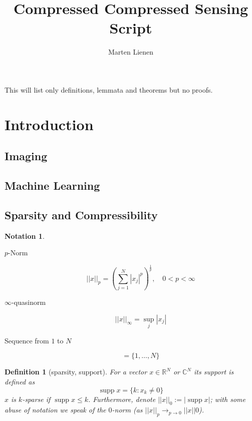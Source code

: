 \documentclass[10pt,a4paper]{article}
\title{Compressed Compressed Sensing Script}
\author{Marten Lienen}
\date{}
\theoremstyle{thmstyle}
\newtheorem{definition}{Definition}
\newtheorem{notation}{Notation}
\DeclareMathOperator{\supp}{supp}
\begin{document}
\maketitle

This will list only definitions, lemmata and theorems but no proofs.

\section{Introduction}

\subsection{Imaging}

\subsection{Machine Learning}

\subsection{Sparsity and Compressibility}

\begin{notation}
  \begin{description}
  \item[$p$-Norm]
    \begin{equation*}
      ||x||_{p} = \left( \sum_{j = 1}^{N} |x_{j}|^{p} \right)^{\frac{1}{p}}, \quad 0 < p < \infty
    \end{equation*}
  \item[$\infty$-quasinorm]
    \begin{equation*}
      ||x||_{\infty} = \sup_{j} |x_{j}|
    \end{equation*}
  \item[Sequence from $1$ to $N$]
    \begin{equation*}
      [N] = \{ 1, \dots, N \}
    \end{equation*}
  \end{description}
\end{notation}

\begin{definition}[sparsity, support]
  For a vector $x \in \mathbb{R}^{N}$ or $\mathbb{C}^{N}$ its \emph{support} is defined as
  \begin{equation*}
    \supp x = \{ k : x_{k} \ne 0 \}
  \end{equation*}
  $x$ is \emph{$k$-sparse} if $\supp x \le k$.
  Furthermore, denote $||x||_{0} := |\supp x|$; with some abuse of notation we speak of the $0$-norm (as $||x||_{p} \rightarrow_{p \rightarrow 0} ||x||0$).
\end{definition}
\end{document}
